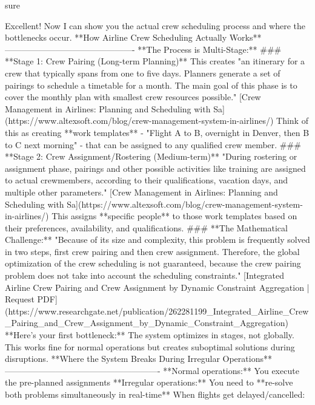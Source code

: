 \begin{userprompt}
sure
\end{userprompt}

\begin{botresponse}
Excellent! Now I can show you the actual crew scheduling process and where the bottlenecks occur.
**How Airline Crew Scheduling Actually Works**
----------------------------------------------
**The Process is Multi-Stage:**
\#\#\# **Stage 1: Crew Pairing (Long-term Planning)**
This creates "an itinerary for a crew that typically spans from one to five days. Planners generate a set of pairings to schedule a timetable for a month. The main goal of this phase is to cover the monthly plan with smallest crew resources possible." [Crew Management in Airlines: Planning and Scheduling with Sa](https://www.altexsoft.com/blog/crew-management-system-in-airlines/)
Think of this as creating **work templates** - "Flight A to B, overnight in Denver, then B to C next morning" - that can be assigned to any qualified crew member.
\#\#\# **Stage 2: Crew Assignment/Rostering (Medium-term)**
"During rostering or assignment phase, pairings and other possible activities like training are assigned to actual crewmembers, according to their qualifications, vacation days, and multiple other parameters." [Crew Management in Airlines: Planning and Scheduling with Sa](https://www.altexsoft.com/blog/crew-management-system-in-airlines/)
This assigns **specific people** to those work templates based on their preferences, availability, and qualifications.
\#\#\# **The Mathematical Challenge:**
"Because of its size and complexity, this problem is frequently solved in two steps, first crew pairing and then crew assignment. Therefore, the global optimization of the crew scheduling is not guaranteed, because the crew pairing problem does not take into account the scheduling constraints." [Integrated Airline Crew Pairing and Crew Assignment by Dynamic Constraint Aggregation | Request PDF](https://www.researchgate.net/publication/262281199\_Integrated\_Airline\_Crew\_Pairing\_and\_Crew\_Assignment\_by\_Dynamic\_Constraint\_Aggregation)
**Here's your first bottleneck:** The system optimizes in stages, not globally. This works fine for normal operations but creates suboptimal solutions during disruptions.
**Where the System Breaks During Irregular Operations**
-------------------------------------------------------
**Normal operations:** You execute the pre-planned assignments **Irregular operations:** You need to **re-solve both problems simultaneously in real-time**
When flights get delayed/cancelled:

\end{botresponse}

